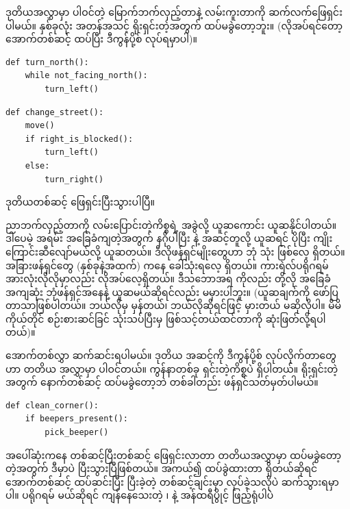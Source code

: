 ဒုတိယအလွှာမှာ ပါဝင်တဲ့ မြောက်ဘက်လှည့်တာနဲ့ လမ်းကူးတာကို ဆက်လက်ဖြေရှင်းပါမယ်။ နှစ်ခုလုံး အတန်အသင့် ရိုးရှင်းတဲ့အတွက် ထပ်မခွဲတော့ဘူး။ (လိုအပ်ရင်တော့ အောက်တစ်ဆင့် ထပ်ပြီး ဒီကွန်ပို့စ် လုပ်ရမှာပါ)။
%
\setlength{\fboxsep}{0pt}
\begin{verbatim}
def turn_north():
    while not_facing_north():
        turn_left()
\end{verbatim}
%
\betweenminted{\medskipamount}
%
\setlength{\fboxsep}{0pt}
\begin{verbatim}
def change_street():
    move()
    if right_is_blocked():
        turn_left()
    else:
        turn_right()
\end{verbatim}
%
ဒုတိယတစ်ဆင့် ဖြေရှင်းပြီးသွားပါပြီ။
\begin{mytcbox}
ညာဘက်လှည့်တာကို လမ်းပြောင်းတဲ့ကိစ္စရဲ့ အခွဲလို့ ယူဆကောင်း ယူဆနိုင်ပါတယ်။ ဒါပေမဲ့ အရမ်း အခြေခံကျတဲ့အတွက် နဂိုပါပြီး  နဲ့ အဆင့်တူလို့ ယူဆရင် ပိုပြီး ကျိုးကြောင်းဆီလျော်မယ်လို့ ယူဆတယ်။ ဒီလိုဖန်ရှင်မျိုးတွေဟာ ဘုံ  သုံး ဖြစ်လေ့ ရှိတယ်။ အခြားဖန်ရှင်တွေ (နှစ်ခုနဲ့အထက်) ကနေ ခေါ်သုံးရလေ့ ရှိတယ်။ ကားရဲလ်ပရိုဂရမ် အားလုံးလိုလိုမှာလည်း လိုအပ်လေ့ရှိတယ်။ ဒီသဘောအရ  ကိုလည်း \fEn{,}  တို့လို အခြေခံ အကျဆုံး ဘုံဖန်ရှင်အနေနဲ့ ယူဆမယ်ဆိုရင်လည်း မမှားပါဘူး။
\betweentcboxpar
(ယူဆချက်ကို ဖော်ပြတာသာဖြစ်ပါတယ်။ ဘယ်လိုမှ မှန်တယ်၊ ဘယ်လိုဆိုရင်ဖြင့် မှားတယ် မဆိုလိုပါ။ မိမိကိုယ်တိုင် စဉ်းစားဆင်ခြင် သုံးသပ်ပြီးမှ ဖြစ်သင့်တယ်ထင်တာကို ဆုံးဖြတ်လို့ရပါတယ်)။ 
\end{mytcbox}
အောက်တစ်လွှာ ဆက်ဆင်းရပါမယ်။ ဒုတိယ အဆင့်ကို ဒီကွန်ပို့စ် လုပ်လိုက်တာတွေဟာ တတိယ အလွှာမှာ ပါဝင်တယ်။  ကွန်နာတစ်ခု ရှင်းတဲ့ကိစ္စပဲ ရှိပါတယ်။ ရိုးရှင်းတဲ့အတွက် နောက်တစ်ဆင့် ထပ်မခွဲတော့ဘဲ တစ်ခါတည်း ဖန်ရှင်သတ်မှတ်ပါမယ်။ 
%
\setlength{\fboxsep}{0pt}
\begin{verbatim}
def clean_corner():
    if beepers_present():
        pick_beeper()
\end{verbatim}
%
အပေါ်ဆုံးကနေ တစ်ဆင့်ပြီးတစ်ဆင့် ဖြေရှင်းလာတာ တတိယအလွှာမှာ ထပ်မခွဲတော့တဲ့အတွက် ဒီမှာပဲ ပြီးသွားပြီဖြစ်တယ်။ အကယ်၍ ထပ်ခွဲထားတာ ရှိတယ်ဆိုရင် အောက်တစ်ဆင့် ထပ်ဆင်းပြီး ပြီးခဲ့တဲ့ တစ်ဆင့်ချင်းမှာ လုပ်ခဲ့သလိုပဲ ဆက်သွားရမှာပါ။ ပရိုဂရမ်  မယ်ဆိုရင် ကျန်နေသေးတဲ့  ၊  နဲ့ အန်ထရီပွိုင့် ဖြည့်ရုံပါပဲ

